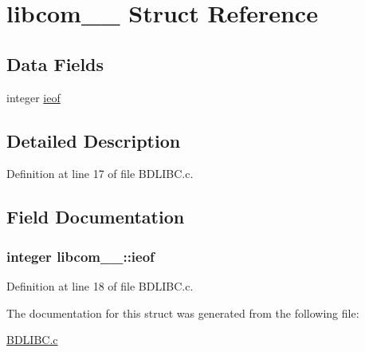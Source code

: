 \hypertarget{structlibcom__1__}{}\section{libcom\+\_\+\_\+ Struct Reference}
\label{structlibcom__1__}
\subsection*{Data Fields}
\begin{DoxyCompactItemize}
\item 
integer \hyperlink{structlibcom__1___abf956b7c7534c5874a7b735398c82ad5}{ieof}
\end{DoxyCompactItemize}


\subsection{Detailed Description}


Definition at line 17 of file B\+D\+L\+I\+B\+C.\+c.



\subsection{Field Documentation}
\subsubsection[{\texorpdfstring{ieof}{ieof}}]{\setlength{\rightskip}{0pt plus 5cm}integer libcom\+\_\+\_\+\+::ieof}\hypertarget{structlibcom__1___abf956b7c7534c5874a7b735398c82ad5}{}\label{structlibcom__1___abf956b7c7534c5874a7b735398c82ad5}


Definition at line 18 of file B\+D\+L\+I\+B\+C.\+c.



The documentation for this struct was generated from the following file\+:\begin{DoxyCompactItemize}
\item 
\hyperlink{BDLIBC_8c}{B\+D\+L\+I\+B\+C.\+c}\end{DoxyCompactItemize}
